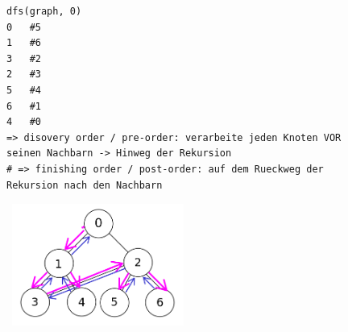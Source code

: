 \documentclass[11pt, fleqn]{scrreprt}
\begin{document}
    \newpage
    \begin{figure}[htbp]
        \begin{minipage}[t]{11cm}
            \vspace{0cm}
            \begin{verbatim}
dfs(graph, 0)
0   #5
1   #6
3   #2
2   #3
5   #4
6   #1
4   #0
=> disovery order / pre-order: verarbeite jeden Knoten VOR seinen Nachbarn -> Hinweg der Rekursion
# => finishing order / post-order: auf dem Rueckweg der Rekursion nach den Nachbarn
            \end{verbatim}
        \end{minipage}
        \begin{minipage}[t]{6cm}
            \vspace{0.0cm}
            \includegraphics[width=6cm,height=4cm,keepaspectratio]{./Pictures/DFS.png}
        \end{minipage}
    \end{figure}
\end{document}
